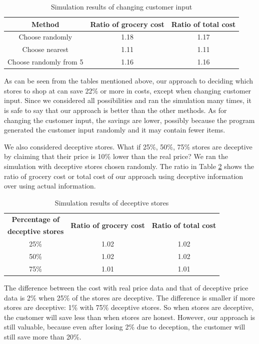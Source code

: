 \begin{table}[!t]
\caption{Simulation results of changing customer input}

\centering
\begin{tabular}{|c|c|c|}
\hline
\textbf{Method} & \textbf{Ratio of grocery cost}& \textbf{Ratio of total cost}\\ \hline
 Choose randomly& 1.18& 1.17\\ \hline
 Choose nearest& 1.11& 1.11\\ \hline
 Choose randomly from 5& 1.16& 1.16\\ \hline
\end{tabular}
\label{ch2:t6}
\end{table}

As can be seen from the tables mentioned above, our approach to deciding which stores to shop at can save 22\% or more in costs, except when changing customer input. Since we considered all possibilities and ran the simulation many times, it is safe to say that our approach is better than the other methods. As for changing the customer input, the savings are lower, possibly because the program generated the customer input randomly and it may contain fewer items.

We also considered deceptive stores. What if 25\%, 50\%, 75\% stores are deceptive by claiming that their price is 10\% lower than the real price? We ran the simulation with deceptive stores chosen randomly. The ratio in Table \ref{ch2:t7} shows the ratio of grocery cost or total cost of our approach using deceptive information over using actual information.

\begin{table}[!t]
\caption{Simulation results of deceptive stores}

\centering
\begin{tabular}{|c|c|c|}
\hline
\textbf{Percentage of}  & \multirow {2}{*}{\textbf{Ratio of grocery cost}}& \multirow {2}{*}{\textbf{Ratio of total cost}}\\ 
\textbf{deceptive stores}& & \\ \hline
 25\%& 1.02& 1.02\\ \hline
 50\%& 1.02& 1.02\\ \hline
 75\%& 1.01& 1.01\\ \hline
\end{tabular}
\label{ch2:t7}
\end{table}

The difference between the cost with real price data and that of deceptive price data is 2\% when 25\% of the stores are deceptive. The difference is smaller if more stores are deceptive: 1\% with 75\% deceptive stores. So when stores are deceptive, the customer will save less than when stores are honest. However, our approach is still valuable, because even after losing 2\% due to deception, the customer will still save more than 20\%.

